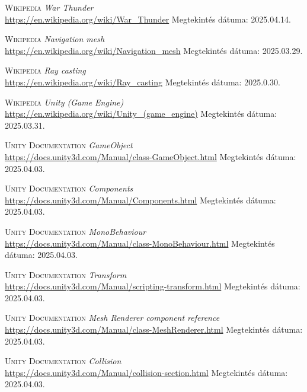 \documentclass[
]{thesis-ekf}
\theoremstyle{definition}
\theoremstyle{remark}
\begin{document}
\begin{thebibliography}{55}

    \textsc{Wikipedia} \emph{War Thunder} \\
    \url{https://en.wikipedia.org/wiki/War_Thunder} Megtekintés dátuma: 2025.04.14.

    \textsc{Wikipedia} \emph{Navigation mesh} \\
    \url{https://en.wikipedia.org/wiki/Navigation_mesh} Megtekintés dátuma: 2025.03.29.

    \textsc{Wikipedia} \emph{Ray casting} \\
    \url{https://en.wikipedia.org/wiki/Ray_casting} Megtekintés dátuma: 2025.0.30.

    \textsc{Wikipedia} \emph{Unity (Game Engine)} \\
    \url{https://en.wikipedia.org/wiki/Unity_(game_engine)} Megtekintés dátuma: 2025.03.31.

    \textsc{Unity Documentation} \emph{GameObject} \\
    \url{https://docs.unity3d.com/Manual/class-GameObject.html} Megtekintés dátuma: 2025.04.03.

    \textsc{Unity Documentation} \emph{Components} \\
    \url{https://docs.unity3d.com/Manual/Components.html} Megtekintés dátuma: 2025.04.03.

    \textsc{Unity Documentation} \emph{MonoBehaviour} \\
    \url{https://docs.unity3d.com/Manual/class-MonoBehaviour.html} Megtekintés dátuma: 2025.04.03.

    \textsc{Unity Documentation} \emph{Transform} \\
    \url{https://docs.unity3d.com/Manual/scripting-transform.html} Megtekintés dátuma: 2025.04.03.

    \textsc{Unity Documentation} \emph{Mesh Renderer component reference} \\
    \url{https://docs.unity3d.com/Manual/class-MeshRenderer.html} Megtekintés dátuma: 2025.04.03.

    \textsc{Unity Documentation} \emph{Collision} \\
    \url{https://docs.unity3d.com/Manual/collision-section.html} Megtekintés dátuma: 2025.04.03.


\end{thebibliography}
\end{document}
